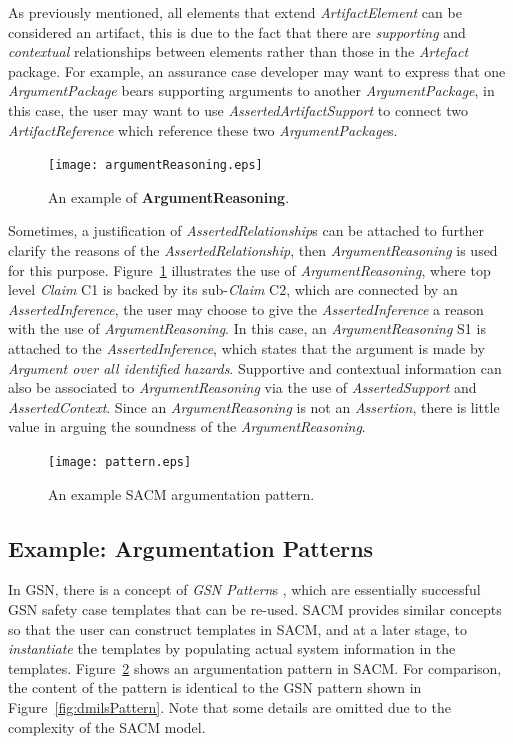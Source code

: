 As previously mentioned, all elements that extend \textit{ArtifactElement} can be considered an artifact, this is due to the fact that there are \textit{supporting} and \textit{contextual} relationships between elements rather than those in the \textit{Artefact} package. 
For example, an assurance case developer may want to express that one \textit{ArgumentPackage} bears supporting arguments to another \textit{ArgumentPackage}, in this case, the user may want to use \textit{AssertedArtifactSupport} to connect two \textit{ArtifactReference} which reference these two \textit{ArgumentPackage}s. 

\begin{figure}
	\centering
	\texttt{[image: argumentReasoning.eps]}
	\caption{An example of \textbf{ArgumentReasoning}.}
	\label{fig:argumentReasoning}
\end{figure}

Sometimes, a justification of \textit{AssertedRelationship}s can be attached to further clarify the reasons of the \textit{AssertedRelationship}, then \textit{ArgumentReasoning} is used for this purpose. Figure~\ref{fig:argumentReasoning} illustrates the use of \textit{ArgumentReasoning}, where top level \textit{Claim} C1 is backed by its sub-\textit{Claim} C2, which are connected by an \textit{AssertedInference}, the user may choose to give the \textit{AssertedInference} a reason with the use of \textit{ArgumentReasoning}. 
In this case, an \textit{ArgumentReasoning} S1 is attached to the \textit{AssertedInference}, which states that the argument is made by \textit{Argument over all identified hazards}. 
Supportive and contextual information can also be associated to \textit{ArgumentReasoning} via the use of \textit{AssertedSupport} and \textit{AssertedContext}. 
Since an \textit{ArgumentReasoning} is not an \textit{Assertion}, there is little value in arguing the soundness of the \textit{ArgumentReasoning}. 

\begin{figure}
	\centering
	\texttt{[image: pattern.eps]}
	\caption{An example SACM argumentation pattern.}
	\label{fig:sacmPattern}
\end{figure}

\subsection{Example: Argumentation Patterns}
\label{sec:patterns}
In GSN, there is a concept of \textit{GSN Pattern}s \cite{kelly1997safety}, which are essentially successful GSN safety case templates that can be re-used. 
SACM provides similar concepts so that the user can construct templates in SACM, and at a later stage, to \textit{instantiate} the templates by populating actual system information in the templates. 
Figure~\ref{fig:sacmPattern} shows an argumentation pattern in SACM. For comparison, the content of the pattern is identical to the GSN pattern shown in Figure~\ref{fig:dmilsPattern}. 
Note that some details are omitted due to the complexity of the SACM model.

